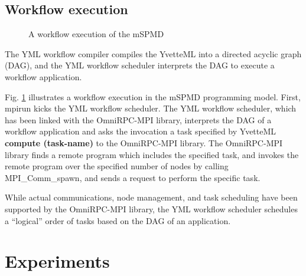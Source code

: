 \documentclass[graybox]{svmult}
\begin{document}
\subsection{Workflow execution}

\begin{figure}[t]
 \begin{center}
  \caption{A workflow execution of the mSPMD}
  \label{figure:app-execution}
 \end{center}
\end{figure}

The YML workflow compiler compiles the YvetteML into a directed acyclic graph (DAG), and the YML workflow scheduler interprets the DAG to execute a workflow application. 

Fig. \ref{figure:app-execution} illustrates a workflow execution in the mSPMD programming model. 
First, mpirun kicks the YML workflow scheduler. The YML workflow scheduler, which has been linked with the OmniRPC-MPI library, interprets the DAG of a workflow application and asks the invocation a task specified by YvetteML {\bf compute (task-name)} to the OmniRPC-MPI library. The OmniRPC-MPI library finds a remote program which includes the specified task, and invokes the remote program over the specified number of nodes by calling MPI\_Comm\_spawn, and sends a request to perform the specific task. 

While actual communications, node management, and task scheduling have been supported by the OmniRPC-MPI library, the YML workflow scheduler schedules a ``logical'' order of tasks based on the DAG of an application.

\section{Experiments} 
\label{section:experiment}
\end{document}
